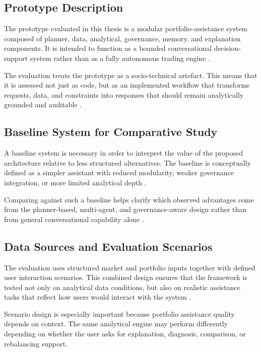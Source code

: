 \documentclass[11pt]{article}
\begin{document}
\subsection{Prototype Description}
The prototype evaluated in this thesis is a modular portfolio-assistance system composed of planner, data, analytical, governance, memory, and explanation components. It is intended to function as a bounded conversational decision-support system rather than as a fully autonomous trading engine \cite{wu2023,yu2023,mifid2014}.

The evaluation treats the prototype as a socio-technical artefact. This means that it is assessed not just as code, but as an implemented workflow that transforms requests, data, and constraints into responses that should remain analytically grounded and auditable \cite{adadi2018,arrieta2020}.

\subsection{Baseline System for Comparative Study}
A baseline system is necessary in order to interpret the value of the proposed architecture relative to less structured alternatives. The baseline is conceptually defined as a simpler assistant with reduced modularity, weaker governance integration, or more limited analytical depth \cite{bahrammirzaee2010,li2023}.

Comparing against such a baseline helps clarify which observed advantages come from the planner-based, multi-agent, and governance-aware design rather than from general conversational capability alone \cite{wooldridge2009,white2000}.

\subsection{Data Sources and Evaluation Scenarios}
The evaluation uses structured market and portfolio inputs together with defined user interaction scenarios. This combined design ensures that the framework is tested not only on analytical data conditions, but also on realistic assistance tasks that reflect how users would interact with the system \cite{markowitz1952,cont2001,wu2023}.

Scenario design is especially important because portfolio assistance quality depends on context. The same analytical engine may perform differently depending on whether the user asks for explanation, diagnosis, comparison, or rebalancing support.
\end{document}
